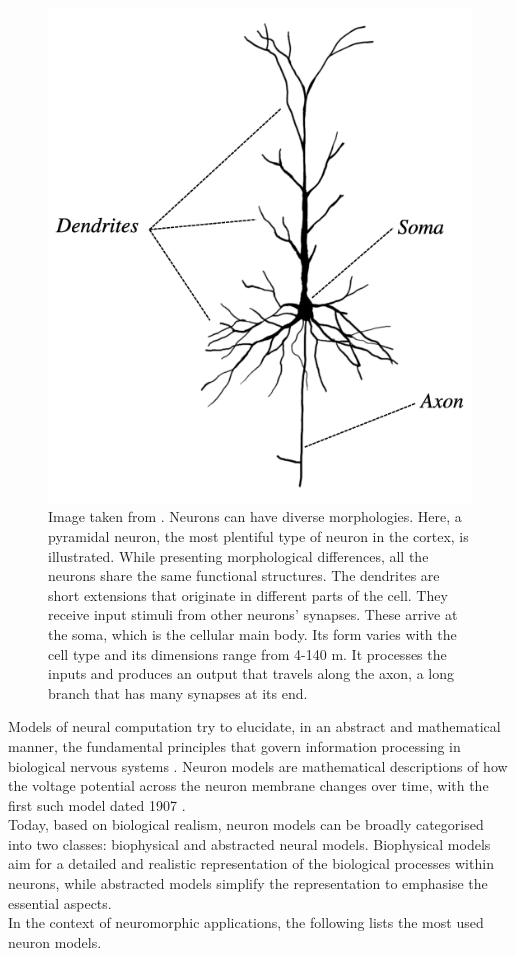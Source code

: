\begin{figure}[hbt!]
    \begin{center}
    \includegraphics[width=0.5\linewidth]{img/neu_morp_paper.png}
    \end{center}
    \caption[Neuron morphology]{Image taken from \cite{Walter}. Neurons can have diverse morphologies. Here, a pyramidal neuron, the most plentiful type of neuron in the cortex, is illustrated. While presenting morphological differences, all the neurons share the same functional structures. The dendrites are short extensions that originate in different parts of the cell. They receive input stimuli from other neurons’ synapses. These arrive at the soma, which is the cellular main body. Its form varies with the cell type and its dimensions range from 4-140 \textmu m. It processes the inputs and produces an output that travels along the axon, a long branch that has many synapses at its end.}
    \label{fig:neuron morphology}
\end{figure}

Models of neural computation try to elucidate, in an abstract and mathematical manner, the fundamental principles that govern information processing in biological nervous systems \cite{Koch2001,Koch2004}. Neuron models are mathematical descriptions of how the voltage potential across the neuron membrane changes over time, with the first such model dated 1907 \cite{Lapicque}.\\
Today, based on biological realism, neuron models can be broadly categorised into two classes: biophysical and abstracted neural models. Biophysical models aim for a detailed and realistic representation of the biological processes within neurons, while abstracted models simplify the representation to emphasise the essential aspects.\\
In the context of neuromorphic applications, the following lists the most used neuron models.\\

